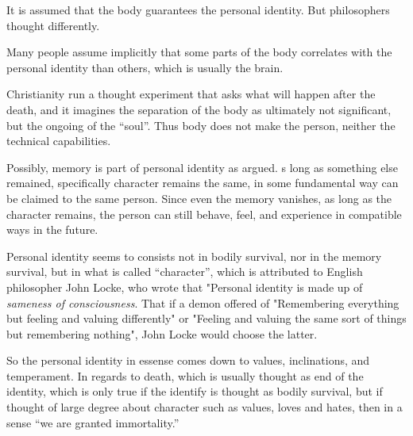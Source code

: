 \documentclass[12pt, UTF8]{article}
\begin{document}
	It is assumed that the body guarantees the personal identity. But philosophers thought differently.
	
	Many people assume implicitly that some parts of the body correlates with the personal identity than others, which is usually the brain.
	
	Christianity run a thought experiment that asks what will happen after the death, and it imagines the separation of the body as ultimately not significant, but the ongoing of the ``soul''. Thus body does not make the person, neither the technical capabilities.
	
	Possibly, memory is part of personal identity as argued. s long as something else remained, specifically character remains the same, in some fundamental way can be claimed to the same person. Since even the memory vanishes, as long as the character remains, the person can still behave, feel, and experience in compatible ways in the future.
	
	Personal identity seems to consists not in bodily survival, nor in the memory survival, but in what is called ``character'', which is attributed to English philosopher John Locke, who wrote that "Personal identity is made up of \emph{sameness of consciousness}. That if a demon offered of "Remembering everything but feeling and valuing differently" or "Feeling and valuing the same sort of things but remembering nothing", John Locke would choose the latter.
	
	So the personal identity in essense comes down to values, inclinations, and temperament. In regards to death, which is usually thought as end of the identity, which is only true if the identify is thought as bodily survival, but if thought of large degree about character such as values, loves and hates, then in a sense ``we are granted immortality.''
\end{document}
